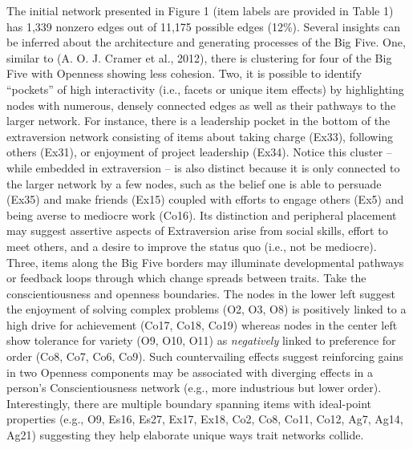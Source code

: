 \documentclass[man]{apa6}
\begin{document}
The initial network presented in Figure 1 (item labels are provided in
Table 1) has 1,339 nonzero edges out of 11,175 possible edges (12\%).
Several insights can be inferred about the architecture and generating
processes of the Big Five. One, similar to (A. O. J. Cramer et al.,
2012), there is clustering for four of the Big Five with Openness
showing less cohesion. Two, it is possible to identify \enquote{pockets}
of high interactivity (i.e., facets or unique item effects) by
highlighting nodes with numerous, densely connected edges as well as
their pathways to the larger network. For instance, there is a
leadership pocket in the bottom of the extraversion network consisting
of items about taking charge (Ex33), following others (Ex31), or
enjoyment of project leadership (Ex34). Notice this cluster -- while
embedded in extraversion -- is also distinct because it is only
connected to the larger network by a few nodes, such as the belief one
is able to persuade (Ex35) and make friends (Ex15) coupled with efforts
to engage others (Ex5) and being averse to mediocre work (Co16). Its
distinction and peripheral placement may suggest assertive aspects of
Extraversion arise from social skills, effort to meet others, and a
desire to improve the status quo (i.e., not be mediocre). Three, items
along the Big Five borders may illuminate developmental pathways or
feedback loops through which change spreads between traits. Take the
conscientiousness and openness boundaries. The nodes in the lower left
suggest the enjoyment of solving complex problems (O2, O3, O8) is
positively linked to a high drive for achievement (Co17, Co18, Co19)
whereas nodes in the center left show tolerance for variety (O9, O10,
O11) as \emph{negatively} linked to preference for order (Co8, Co7, Co6,
Co9). Such countervailing effects suggest reinforcing gains in two
Openness components may be associated with diverging effects in a
person's Conscientiousness network (e.g., more industrious but lower
order). Interestingly, there are multiple boundary spanning items with
ideal-point properties (e.g., O9, Es16, Es27, Ex17, Ex18, Co2, Co8,
Co11, Co12, Ag7, Ag14, Ag21) suggesting they help elaborate unique ways
trait networks collide.
\end{document}
